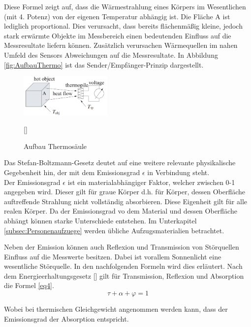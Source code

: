 Diese Formel zeigt auf, dass die Wärmestrahlung eines Körpers im Wesentlichen (mit 4. Potenz) von der eigenen Temperatur abhängig ist. 
Die Fläche A ist lediglich proportional. Dies verursacht, dass bereits flächenmäßig kleine, jedoch stark erwärmte Objekte im Messbereich einen bedeutenden Einfluss auf die Messresultate liefern können. Zusätzlich verursachen Wärmequellen im nahen Umfeld des Sensors Abweichungen auf die Messresultate. In Abbildung \ref{fig:AufbauThermo} ist das Sender/Empfänger-Prinzip dargestellt.

\begin{figure}[H]
	\centering
	\includegraphics[width=0.4\textwidth]
	{fig/seebeck2.PNG}
	\caption[Aufbau Thermosäule]{Aufbau Thermosäule} [\protect\cite{seebeck}]
	\label{fig:thermosäule}
\end{figure}


Das Stefan-Boltzmann-Gesetz deutet auf eine weitere relevante physikalische Gegebenheit hin, der mit dem Emissionsgrad $\epsilon$  in Verbindung steht.\\
 Der Emissionsgrad $\epsilon$ ist ein materialabhängiger Faktor, welcher zwischen 0-1  angegeben wird. Dieser gilt für graue Körper d.h. für Körper, dessen Oberfläche auftreffende Strahlung nicht vollständig absorbieren. Diese Eigenheit gilt für alle realen Körper. Da der Emissionsgrad vo dem Material und dessen Oberfläche abhängt können starke Unterschiede entstehen. Im Unterkapitel \ref{subsec:Personenaufzuege} werden übliche Aufzugsmaterialien betrachtet.

Neben der Emission können auch Reflexion und Transmission von Störquellen Einfluss auf die Messwerte besitzen. Dabei ist vorallem Sonnenlicht eine wesentliche Störquelle. In den nachfolgenden Formeln wird dies erläutert. Nach dem Energieerhaltungsgesetz [\protect\cite{Thermoformeln}] gilt für Transmission, Reflexion und Absorption die Formel \ref{eq4}.
\begin{equation}
\label{eq4}
\tau  + \alpha + \varphi  = 1
\end{equation}

Wobei bei thermischen Gleichgewicht angenommen werden kann, dass der Emissionsgrad der Absorption entspricht.

